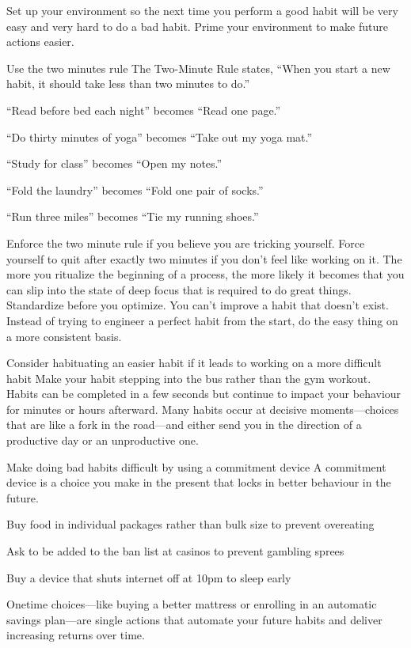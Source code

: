 \documentclass[10pt,twocolumn]{../notes}
\begin{document}
\Advice Set up your environment so the next time you perform a good habit will be very easy and very hard to do a bad habit.
\Quote Prime your environment to make future actions easier.

\Advice Use the two minutes rule
\Quote The Two-Minute Rule states, “When you start a new habit, it should take less than two minutes to do.”
\begin{Examplelist}{}
\item “Read before bed each night” becomes “Read one page.”
\item “Do thirty minutes of yoga” becomes “Take out my yoga mat.”
\item “Study for class” becomes “Open my notes.”
\item “Fold the laundry” becomes “Fold one pair of socks.”
\item “Run three miles” becomes “Tie my running shoes.”
\end{Examplelist}

\Advice Enforce the two minute rule if you believe you are tricking yourself. Force yourself to quit after exactly two minutes if you don’t feel like working on it.
\Quote The more you ritualize the beginning of a process, the more likely it becomes that you can slip into the state of deep focus that is required to do great things.
\Quote Standardize before you optimize. You can’t improve a habit that doesn’t exist.
\Quote Instead of trying to engineer a perfect habit from the start, do the easy thing on a more consistent basis.

\Advice Consider habituating an easier habit if it leads to working on a more difficult habit
Make your habit stepping into the bus rather than the gym workout.
\Quote Habits can be completed in a few seconds but continue to impact your behaviour for minutes or hours afterward.
\Quote Many habits occur at decisive moments—choices that are like a fork in the road—and either send you in the direction of a productive day or an unproductive one.

\Advice Make doing bad habits difficult by using a commitment device
\Quote A commitment device is a choice you make in the present that locks in better behaviour in the future.
\begin{Examplelist}{}
\item Buy food in individual packages rather than bulk size to prevent overeating
\item Ask to be added to the ban list at casinos to prevent gambling sprees
\item Buy a device that shuts internet off at 10pm to sleep early
\end{Examplelist}
\Quote Onetime choices—like buying a better mattress or enrolling in an automatic savings plan—are single actions that automate your future habits and deliver increasing returns over time.
\end{document}
